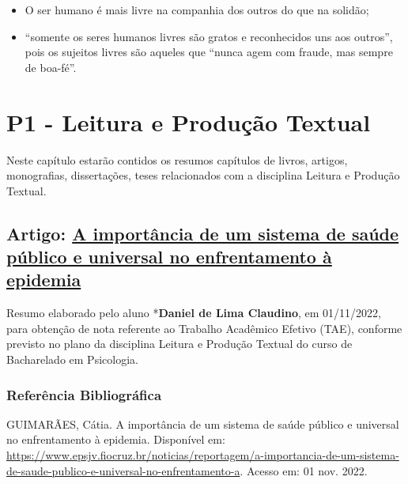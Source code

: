 \documentclass[
]{book}
\providecommand{\tightlist}{%
  \setlength{\itemsep}{0pt}\setlength{\parskip}{0pt}}
\begin{document}
\begin{itemize}
  \begin{itemize}
  \tightlist
  \item
    O ser humano é mais livre na companhia dos outros do que na solidão;
  \item
    ``somente os seres humanos livres são gratos e reconhecidos uns aos
    outros'', pois os sujeitos livres são aqueles que ``nunca agem com
    fraude, mas sempre de boa-fé''.
  \end{itemize}
\end{itemize}

\hypertarget{p1---leitura-e-produuxe7uxe3o-textual}{%
\chapter{P1 - Leitura e Produção
Textual}\label{p1---leitura-e-produuxe7uxe3o-textual}}

Neste capítulo estarão contidos os resumos capítulos de livros, artigos,
monografias, dissertações, teses relacionados com a disciplina Leitura e
Produção Textual.

\hypertarget{artigo-a-importuxe2ncia-de-um-sistema-de-sauxfade-puxfablico-e-universal-no-enfrentamento-uxe0-epidemia}{%
\section{\texorpdfstring{Artigo:
\href{https://www.epsjv.fiocruz.br/noticias/reportagem/a-importancia-de-um-sistema-de-saude-publico-e-universal-no-enfrentamento-a}{A
importância de um sistema de saúde público e universal no enfrentamento
à
epidemia}}{Artigo: A importância de um sistema de saúde público e universal no enfrentamento à epidemia}}\label{artigo-a-importuxe2ncia-de-um-sistema-de-sauxfade-puxfablico-e-universal-no-enfrentamento-uxe0-epidemia}}

Resumo elaborado pelo aluno *\textbf{Daniel de Lima Claudino}, em
01/11/2022, para obtenção de nota referente ao Trabalho Acadêmico
Efetivo (TAE), conforme previsto no plano da disciplina Leitura e
Produção Textual do curso de Bacharelado em Psicologia.

\hypertarget{referuxeancia-bibliogruxe1fica}{%
\subsection{Referência
Bibliográfica}\label{referuxeancia-bibliogruxe1fica}}

GUIMARÃES, Cátia. A importância de um sistema de saúde público e
universal no enfrentamento à epidemia. Disponível em:
\url{https://www.epsjv.fiocruz.br/noticias/reportagem/a-importancia-de-um-sistema-de-saude-publico-e-universal-no-enfrentamento-a}.
Acesso em: 01 nov. 2022.
\end{document}

